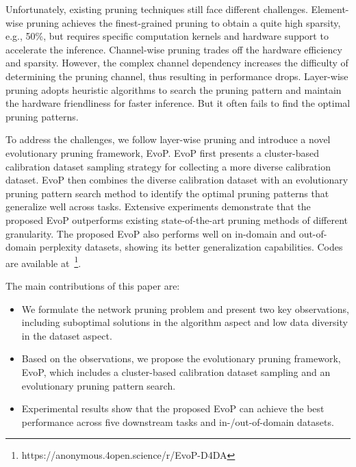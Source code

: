 Unfortunately, existing pruning techniques still face different challenges. 
Element-wise pruning achieves the finest-grained pruning to obtain a quite high sparsity, e.g., 50\%, but requires specific computation kernels and hardware support to accelerate the inference.
Channel-wise pruning trades off the hardware efficiency and sparsity. 
However, the complex channel dependency increases the difficulty of determining the pruning channel, thus resulting in performance drops.
Layer-wise pruning adopts heuristic algorithms to search the pruning pattern and maintain the hardware friendliness for faster inference.
But it often fails to find the optimal pruning patterns.

To address the challenges, we follow layer-wise pruning and introduce a novel evolutionary pruning framework, EvoP.
EvoP first presents a cluster-based calibration dataset sampling strategy for collecting a more diverse calibration dataset.
EvoP then combines the diverse calibration dataset with an evolutionary pruning pattern search method to identify the optimal pruning patterns that generalize well across tasks.
Extensive experiments demonstrate that the proposed EvoP outperforms existing state-of-the-art pruning methods of different granularity.
The proposed EvoP also performs well on in-domain and out-of-domain perplexity datasets, showing its better generalization capabilities. 
Codes are available at~\footnote{https://anonymous.4open.science/r/EvoP-D4DA}.


The main contributions of this paper are:
\begin{itemize}
    \item We formulate the network pruning problem and present two key observations, including suboptimal solutions in the algorithm aspect and low data diversity in the dataset aspect.
    \item Based on the observations, we propose the evolutionary pruning framework, EvoP, which includes a cluster-based calibration dataset sampling and an evolutionary pruning pattern search.
    \item Experimental results show that the proposed EvoP can achieve the best performance across five downstream tasks and in-/out-of-domain datasets.
\end{itemize}
